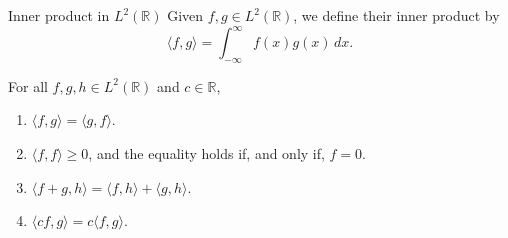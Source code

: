\begin{defn}{Inner product in \(L^2(\mathbb{R})\)}{}
	Given \(f, g \in L^2(\mathbb{R})\), we define their inner product by \[
		\langle f, g \rangle = \int_{-\infty}^\infty f(x)g(x)\,dx.
	\] 
\end{defn}

\begin{prop}{}{}
	For all \(f, g, h \in L^2(\mathbb{R})\) and \(c \in \mathbb{R}\), 
	\begin{enumerate}
		\item \(\langle f, g \rangle = \langle g, f \rangle\).
		\item \(\langle f, f \rangle \geq 0\), and the equality holds if, and only if, \(f = 0\).
		\item \(\langle f + g, h \rangle = \langle f, h \rangle + \langle g, h \rangle\).
		\item \(\langle cf, g \rangle = c\langle f, g \rangle\).
	\end{enumerate}
\end{prop}
